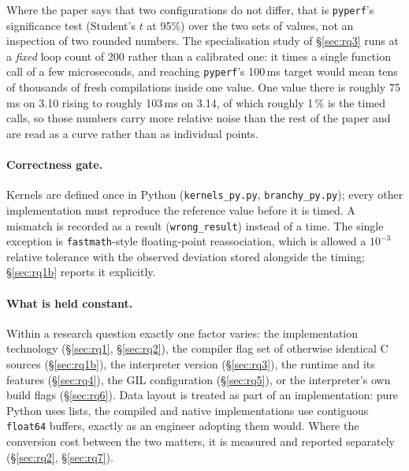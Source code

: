 \documentclass[10pt,a4paper]{article}
\newcommand{\meas}[2]{#2}
\newcommand{\code}[1]{\texttt{\small #1}}
\begin{document}
Where the paper says that two configurations do not differ, that is \code{pyperf}'s
significance test (Student's $t$ at 95\%) over the two sets of values, not an inspection of
two rounded numbers. The
specialisation study of \S\ref{sec:rq3} runs at a \emph{fixed} loop count of 200 rather than a
calibrated one: it times a single function call of a few microseconds, and reaching
\code{pyperf}'s 100\,ms target would mean tens of thousands of fresh compilations inside one
value. One value there is roughly \meas{dur:b3_spec-v310:median}{75}\,ms on 3.10 rising to roughly \meas{dur:b3_spec-v314:median}{103}\,ms on 3.14, of which
roughly 1\,\% is the timed calls, so those
numbers carry more relative noise than the rest of the paper and are read as a curve rather
than as individual points.

\paragraph{Correctness gate.}
Kernels are defined once in Python (\code{kernels\_py.py}, \code{branchy\_py.py}); every
other implementation must reproduce the reference value before it is timed. A mismatch is
recorded as a result (\code{wrong\_result}) instead of a time. The single exception is
\code{fastmath}-style floating-point reassociation, which is allowed a $10^{-3}$ relative
tolerance with the observed deviation stored alongside the timing; \S\ref{sec:rq1b}
reports it explicitly.

\paragraph{What is held constant.}
Within a research question exactly one factor varies: the implementation technology
(\S\ref{sec:rq1}, \S\ref{sec:rq2}), the compiler flag set of otherwise identical C sources
(\S\ref{sec:rq1b}), the interpreter version (\S\ref{sec:rq3}), the runtime and its
features (\S\ref{sec:rq4}), the GIL configuration (\S\ref{sec:rq5}), or the interpreter's
own build flags (\S\ref{sec:rq6}). Data layout is treated as part of an implementation:
pure Python uses lists, the compiled and native implementations use contiguous
\code{float64} buffers, exactly as an engineer adopting them would. Where the conversion
cost between the two matters, it is measured and reported separately
(\S\ref{sec:rq2}, \S\ref{sec:rq7}).
\end{document}
